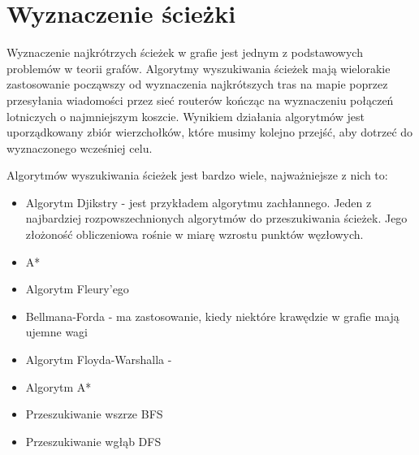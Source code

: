 \chapter{Wyznaczenie ścieżki}

Wyznaczenie najkrótrzych ścieżek w grafie jest jednym z podstawowych problemów w teorii grafów. Algorytmy wyszukiwania ścieżek mają wielorakie zastosowanie począwszy od wyznaczenia najkrótszych tras na mapie poprzez przesyłania wiadomości przez sieć routerów kończąc na wyznaczeniu połączeń lotniczych o najmniejszym koszcie. Wynikiem działania algorytmów jest uporządkowany zbiór wierzchołków, które musimy kolejno przejść, aby dotrzeć do wyznaczonego wcześniej celu.

Algorytmów wyszukiwania ścieżek jest bardzo wiele, najważniejsze z nich to:

\begin{itemize}
\item Algorytm Djikstry - jest przykładem algorytmu zachłannego. Jeden z najbardziej rozpowszechnionych algorytmów do przeszukiwania ścieżek. Jego złożoność obliczeniowa rośnie w miarę wzrostu punktów węzłowych.
\item A*
\item Algorytm Fleury'ego
\item Bellmana-Forda - ma zastosowanie, kiedy niektóre krawędzie w grafie mają ujemne wagi
\item Algorytm Floyda-Warshalla - 
\item Algorytm A*
\item Przeszukiwanie wszrze BFS
\item Przeszukiwanie wgłąb DFS
\end{itemize}